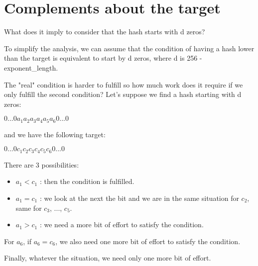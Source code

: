 \chapter{Complements about the target} \label{appendixTarget}

What does it imply to consider that the hash starts with d zeros? \newline

To simplify the analysis, we can assume that the condition of having a hash lower than the target is equivalent to start by d zeros, where d is 256 - exponent\_length. \newline

The "real" condition is harder to fulfill so how much work does it require if we only fulfill the second condition?
Let's suppose we find a hash starting with d zeros: \newline

$0 ... 0 a_1 a_2 a_3 a_4 a_5 a_6 0 ... 0$ \newline

and we have the following target: \newline

$0 ... 0 c_1 c_2 c_3 c_4 c_5 c_6 0 ... 0$ \newline

There are 3 possibilities: \newline

\begin{itemize}
  \item $a_1 < c_1$ : then the condition is fulfilled.
  \item $a_1 = c_1$ : we look at the next the bit and we are in the same situation for $c_2$, same for $c_3$, ..., $c_5$.
  \item $a_1 > c_1$ : we need a more bit of effort to satisfy the condition.
\end{itemize}

For $a_6$, if $a_6 = c_6$, we also need one more bit of effort to satisfy the condition.

Finally, whatever the situation, we need only one more bit of effort.
